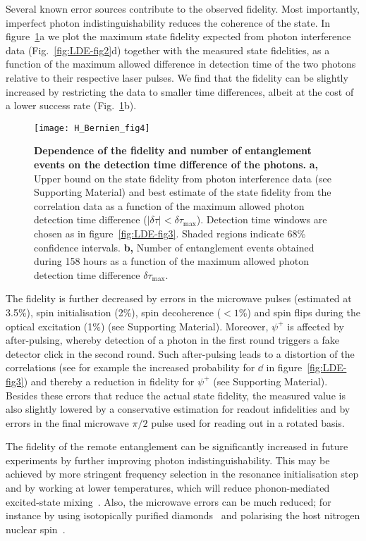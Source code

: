 Several known error sources contribute to the observed fidelity. Most importantly, imperfect photon indistinguishability reduces the coherence of the state. In figure~\ref{fig:LDE-fig4}a we plot the maximum state fidelity expected from photon interference data (Fig.~\ref{fig:LDE-fig2}d) together with the measured state fidelities, as a function of the maximum allowed difference in detection time of the two photons relative to their respective laser pulses. We find that the fidelity can be slightly increased by restricting the data to smaller time differences, albeit at the cost of a lower success rate (Fig.~\ref{fig:LDE-fig4}b).

\begin{figure}[tp]
	\texttt{[image: H\_Bernien\_fig4]}
	\caption{\label{fig:LDE-fig4} \textbf{Dependence of the fidelity and number of entanglement events on the detection time difference of the photons.}
\textbf{a,} Upper bound on the state fidelity from photon interference data (see Supporting Material) and best estimate of the state fidelity from the correlation data as a function of the maximum allowed photon detection time difference ($|\delta\tau|<\delta\tau_\text{max}$). Detection time windows are chosen as in figure~\ref{fig:LDE-fig3}. Shaded regions indicate 68\% confidence intervals. \textbf{b,} Number of entanglement events obtained during 158 hours as a function of the maximum allowed photon detection time difference $\delta\tau_\text{max}$.}
\end{figure}

The fidelity is further decreased by errors in the microwave pulses (estimated at 3.5\%), spin initialisation (2\%), spin decoherence ($<1$\%) and spin flips during the optical excitation (1\%) (see Supporting Material). Moreover, $\psi^+$ is affected by after-pulsing, whereby detection of a photon in the first round triggers a fake detector click in the second round. Such after-pulsing leads to a distortion of the correlations (see for example the increased probability for $\dd$ in figure~\ref{fig:LDE-fig3}) and thereby a reduction in fidelity for $\psi^+$ (see Supporting Material). Besides these errors that reduce the actual state fidelity, the measured value is also slightly lowered by a conservative estimation for readout infidelities and by errors in the final microwave $\pi/2$ pulse used for reading out in a rotated basis.

The fidelity of the remote entanglement can be significantly increased in future experiments by further improving photon indistinguishability. This may be achieved by more stringent frequency selection in the resonance initialisation step and by working at lower temperatures, which will reduce phonon-mediated excited-state mixing~\cite{Fu2009}. Also, the microwave errors can be much reduced; for instance by using isotopically purified diamonds~\cite{Maurer2012} and polarising the host nitrogen nuclear spin~\cite{Robledo2011}.

